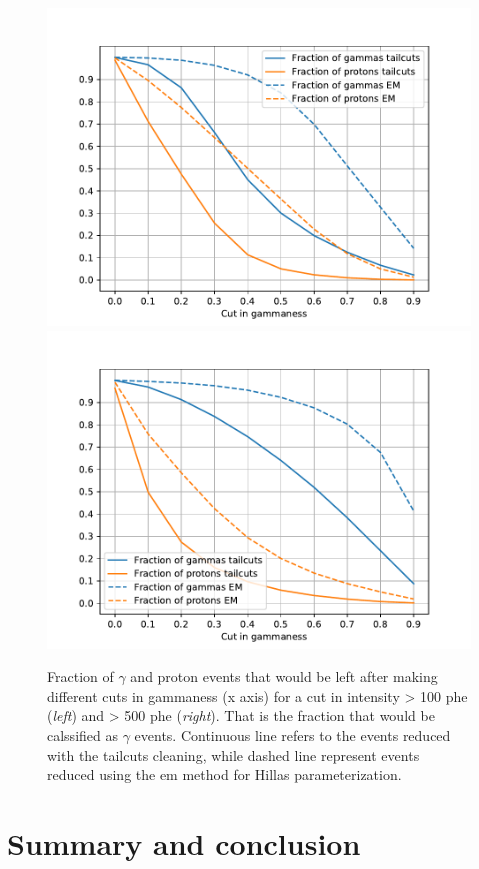 \documentclass[main.tex]{subfiles}
\begin{document}
\begin{figure}[h!]
  \includegraphics[width=0.45\linewidth]{Pictures/fraction_of_protons_gammas_intensity100-1000000.pdf}
  \includegraphics[width=0.45\linewidth]{Pictures/fraction_of_protons_gammas_intensity500-1000000.pdf}
  \caption{Fraction of $\gamma$ and proton events that would be left after making different cuts in gammaness (x axis) for a cut in intensity > 100 phe (\textit{left}) and > 500 phe (\textit{right}). That is the fraction that would be calssified as $\gamma$ events. Continuous line refers to the events reduced with the tailcuts cleaning, while dashed line represent events reduced using the \gls{em} method for Hillas parameterization.}
  \label{fig:fractiongammaness}
\end{figure}



\section{Summary and conclusion}
\end{document}
